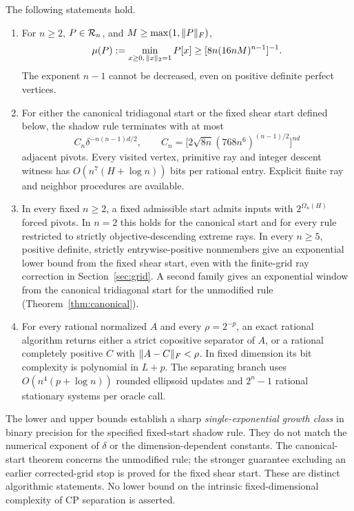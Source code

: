 \begin{theorem}\label{thm:main}
The following statements hold.
\begin{enumerate}[label=(\roman*),leftmargin=*]
\item For $n\ge2$, $P\in\mathcal R_n$, and $M\ge\max(1,\lVert P\rVert_F)$,
\[
\mu(P):=\min_{x\ge0,\,\lVert x\rVert_2=1}P[x]\ge[8n(16nM)^{n-1}]^{-1}.
\]
The exponent $n-1$ cannot be decreased, even on positive definite perfect vertices.
\item For either the canonical tridiagonal start or the fixed shear start defined below, the shadow rule terminates with at most
\[
C_n\delta^{-n(n-1)d/2},\qquad
C_n=\bigl[2\sqrt{8n}(768n^6)^{(n-1)/2}\bigr]^{nd}
\]
adjacent pivots. Every visited vertex, primitive ray and integer descent witness has $O(n^7(H+\log n))$ bits per rational entry. Explicit finite ray and neighbor procedures are available.
\item In every fixed $n\ge2$, a fixed admissible start admits inputs with $2^{\Omega_n(H)}$ forced pivots. In $n=2$ this holds for the canonical start and for every rule restricted to strictly objective-descending extreme rays. In every $n\ge5$, positive definite, strictly entrywise-positive nonmembers give an exponential lower bound from the fixed shear start, even with the finite-grid ray correction in Section~\ref{sec:grid}. A second family gives an exponential window from the canonical tridiagonal start for the unmodified rule (Theorem~\ref{thm:canonical}).
\item For every rational normalized $A$ and every $\rho=2^{-p}$, an exact rational algorithm returns either a strict copositive separator of $A$, or a rational completely positive $C$ with $\lVert A-C\rVert_F<\rho$. In fixed dimension its bit complexity is polynomial in $L+p$. The separating branch uses $O(n^4(p+\log n))$ rounded ellipsoid updates and $2^n-1$ rational stationary systems per oracle call.
\end{enumerate}
\end{theorem}
The lower and upper bounds establish a sharp \emph{single-exponential growth class} in binary precision for the specified fixed-start shadow rule. They do not match the numerical exponent of $\delta$ or the dimension-dependent constants. The canonical-start theorem concerns the unmodified rule; the stronger guarantee excluding an earlier corrected-grid stop is proved for the fixed shear start. These are distinct algorithmic statements. No lower bound on the intrinsic fixed-dimensional complexity of CP separation is asserted.

